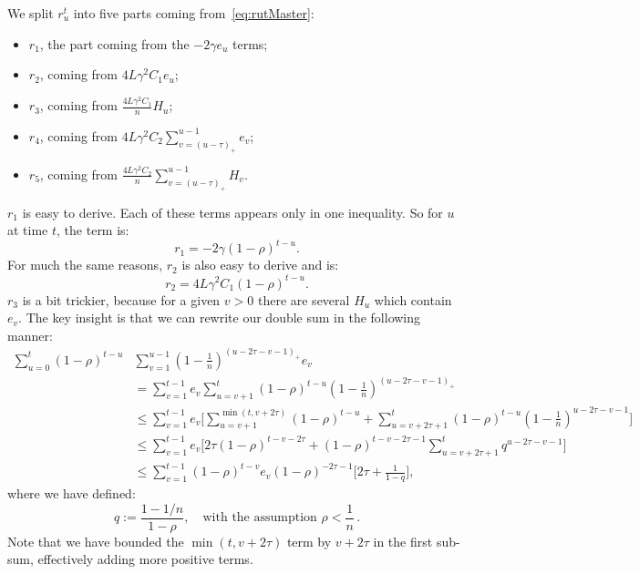 \documentclass[twoside, 11pt]{article}
\newcommand{\stepsize}{\gamma}
\newcommand{\overlap}{\tau}
\newcommand{\contraction}{\rho}
\newcommand{\lipschitz}{L}
\begin{document}
We split $r_u^t$ into five parts coming from~\eqref{eq:rutMaster}:
\begin{itemize}
\item $r_1$, the part coming from the $-2\stepsize e_u$ terms;
\item $r_2$, coming from $4\lipschitz\stepsize^2 C_1 e_u$;
\item $r_3$, coming from $\frac{4\lipschitz\stepsize^2 C_1}{n} H_u$;
\item $r_4$, coming from $4\lipschitz\stepsize^2 C_2\sum_{v=(u-\overlap)_+}^{u-1} e_v$;
\item $r_5$, coming from $\frac{4\lipschitz\stepsize^2 C_2}{n} \sum_{v=(u-\overlap)_+}^{u-1} H_v$.
\end{itemize}
$r_1$ is easy to derive. Each of these terms appears only in one inequality.
So for $u$ at time $t$, the term is:
\begin{equation}\label{eq:r1}
r_1 = -2 \stepsize (1- \contraction)^{t-u} .
\end{equation}
For much the same reasons, $r_2$ is also easy to derive and is:
\begin{equation}\label{eq:r2}
r_2 = 4\lipschitz\stepsize^2 C_1(1- \contraction)^{t-u} .
\end{equation}
$r_3$ is a bit trickier, because for a given $v > 0$ there are several $H_u$ which contain $e_v$.
The key insight is that we can rewrite our double sum in the following manner:
\begin{align}
\sum_{u=0}^t(1 - \contraction)^{t-u} &\sum_{v=1}^{u-1} (1-\frac{1}{n})^{(u - 2\overlap -v -1)_+} e_v
\nonumber \\
&= \sum_{v=1}^{t-1} e_v \sum_{u=v+1}^{t}(1 - \contraction)^{t-u}  (1-\frac{1}{n})^{(u - 2\overlap -v -1)_+}
\nonumber \\
&\leq \sum_{v=1}^{t-1} e_v \Big[
		\sum_{u=v+1}^{\min(t, v + 2\overlap)}(1 - \contraction)^{t-u}
		+ \sum_{u=v + 2 \overlap +1}^{t}(1 - \contraction)^{t-u}  (1-\frac{1}{n})^{u - 2\overlap -v -1}
	\Big]
\nonumber \\
&\leq \sum_{v=1}^{t-1} e_v \Big[
		2\overlap (1 - \contraction)^{t-v-2 \overlap}
		+ (1 - \contraction)^{t-v-2\overlap-1} \sum_{u=v + 2 \overlap +1}^{t}q^{u - 2\overlap -v -1}
	\Big]
\nonumber \\
&\leq \sum_{v=1}^{t-1} (1 - \contraction)^{t-v} e_v (1 - \contraction)^{-2\overlap -1} \big[
		2\overlap
		+ \frac{1}{1-q}
	\big],
\end{align}
where we have defined:
\begin{equation} \label{eq:qDefinition}
q :=\frac{1-1/n}{1-\contraction}, \quad \text{with the assumption $\contraction < \frac{1}{n}$}  \, .
\end{equation}
Note that we have bounded the $\min(t, v+2\overlap)$ term by $v+2\overlap$ in the first sub-sum, effectively adding more positive terms.
\end{document}
